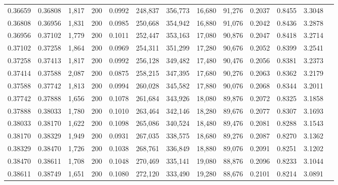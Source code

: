\begin{tabular}{rrrrrrrrrrrrr}
0.36659 & 0.36808 & 1,817 & 200 &                                     0.0992 & 248,837 & 356,773 &  16,680 &  91,276 & 0.2037 & 0.8455 & 3.3048 \\
0.36808 & 0.36956 & 1,831 & 200 &                                     0.0985 & 250,668 & 354,942 &  16,880 &  91,076 & 0.2042 & 0.8436 & 3.2878 \\
0.36956 & 0.37102 & 1,779 & 200 &                                     0.1011 & 252,447 & 353,163 &  17,080 &  90,876 & 0.2047 & 0.8418 & 3.2714 \\
0.37102 & 0.37258 & 1,864 & 200 &                                     0.0969 & 254,311 & 351,299 &  17,280 &  90,676 & 0.2052 & 0.8399 & 3.2541 \\
0.37258 & 0.37413 & 1,817 & 200 &                                     0.0992 & 256,128 & 349,482 &  17,480 &  90,476 & 0.2056 & 0.8381 & 3.2373 \\
0.37414 & 0.37588 & 2,087 & 200 &                                     0.0875 & 258,215 & 347,395 &  17,680 &  90,276 & 0.2063 & 0.8362 & 3.2179 \\
0.37588 & 0.37742 & 1,813 & 200 &                                     0.0994 & 260,028 & 345,582 &  17,880 &  90,076 & 0.2068 & 0.8344 & 3.2011 \\
0.37742 & 0.37888 & 1,656 & 200 &                                     0.1078 & 261,684 & 343,926 &  18,080 &  89,876 & 0.2072 & 0.8325 & 3.1858 \\
0.37888 & 0.38033 & 1,780 & 200 &                                     0.1010 & 263,464 & 342,146 &  18,280 &  89,676 & 0.2077 & 0.8307 & 3.1693 \\
0.38033 & 0.38170 & 1,622 & 200 &                                     0.1098 & 265,086 & 340,524 &  18,480 &  89,476 & 0.2081 & 0.8288 & 3.1543 \\
0.38170 & 0.38329 & 1,949 & 200 &                                     0.0931 & 267,035 & 338,575 &  18,680 &  89,276 & 0.2087 & 0.8270 & 3.1362 \\
0.38329 & 0.38470 & 1,726 & 200 &                                     0.1038 & 268,761 & 336,849 &  18,880 &  89,076 & 0.2091 & 0.8251 & 3.1202 \\
0.38470 & 0.38611 & 1,708 & 200 &                                     0.1048 & 270,469 & 335,141 &  19,080 &  88,876 & 0.2096 & 0.8233 & 3.1044 \\
0.38611 & 0.38749 & 1,651 & 200 &                                     0.1080 & 272,120 & 333,490 &  19,280 &  88,676 & 0.2101 & 0.8214 & 3.0891 \\

\end{tabular}
